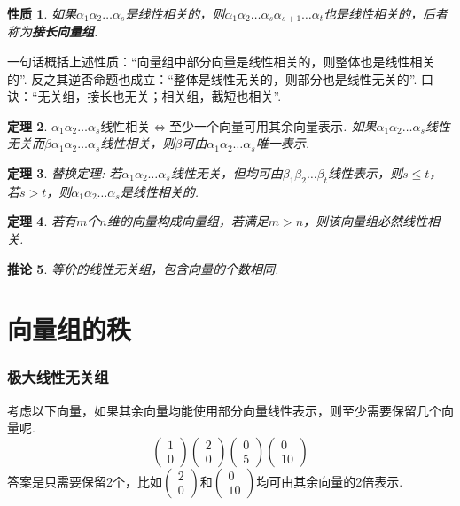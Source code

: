 \documentclass[12pt, a4paper, oneside]{ctexbook}
\newtheorem{theorem}{定理}[section]
\newtheorem{corollary}[theorem]{推论}
\newtheorem{quolity}[theorem]{性质}
\begin{document}
\begin{quolity}
    如果$\alpha_1 \alpha_2 \dots \alpha_s$是线性相关的，则$\alpha_1 \alpha_2 \dots \alpha_s \alpha_{s+1} \dots \alpha_t$也是线性相关的，后者称为\textbf{接长向量组}. 
\end{quolity}
一句话概括上述性质：``向量组中部分向量是线性相关的，则整体也是线性相关的''. 反之其逆否命题也成立：``整体是线性无关的，则部分也是线性无关的''. 
口诀：``无关组，接长也无关；相关组，截短也相关''.

\begin{theorem}
    $\alpha_1 \alpha_2 \dots \alpha_s \mbox{线性相关} \Leftrightarrow \mbox{至少一个向量可用其余向量表示}$. 如果$\alpha_1 \alpha_2 \dots \alpha_s$线性无关而$\beta \alpha_1 \alpha_2 \dots \alpha_s$线性相关，则$\beta$可由$\alpha_1 \alpha_2 \dots \alpha_s$唯一表示. 
\end{theorem}

\begin{theorem}
    替换定理: 若$\alpha_1 \alpha_2 \dots \alpha_s$线性无关，但均可由$\beta_1 \beta_2 \dots \beta_t$线性表示，则$s \le t$，若$s > t$，则$\alpha_1 \alpha_2 \dots \alpha_s$是线性相关的. 
\end{theorem}

\begin{theorem}
    若有$m$个$n$维的向量构成向量组，若满足$m > n$，则该向量组必然线性相关. 
\end{theorem}

\begin{corollary}
    等价的线性无关组，包含向量的个数相同. 
\end{corollary}

\section{向量组的秩}

\subsubsection{极大线性无关组}

考虑以下向量，如果其余向量均能使用部分向量线性表示，则至少需要保留几个向量呢. 
$$\begin{pmatrix}
    1 \\ 0
\end{pmatrix} \begin{pmatrix}
    2 \\ 0
\end{pmatrix} \begin{pmatrix}
    0 \\ 5
\end{pmatrix} \begin{pmatrix}
    0 \\10
\end{pmatrix}$$
答案是只需要保留2个，比如$\begin{pmatrix}
    2 \\ 0
\end{pmatrix}$和$\begin{pmatrix}
    0 \\ 10
\end{pmatrix}$均可由其余向量的2倍表示. 
\end{document}
